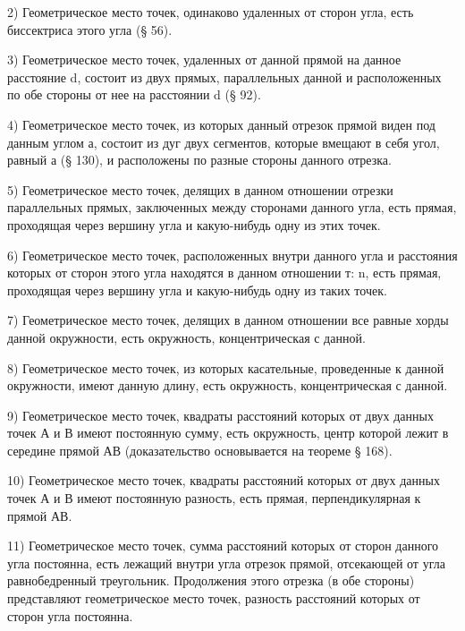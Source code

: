 2)                                  Геометрическое место точек, одинаково удаленных от сторон угла, есть биссектриса этого угла (§ 56).

3)                                     Геометрическое место точек, удаленных от данной прямой на данное расстояние d, состоит из двух прямых, параллельных данной и расположенных по обе стороны от нее на расстоянии d (§ 92).

4)                                  Геометрическое место точек, из которых данный отрезок прямой виден под данным углом а, состоит из дуг двух сегментов, которые вмещают в себя угол, равный а (§ 130), и расположены по разные стороны данного отрезка.

5)                                  Геометрическое место точек, делящих в данном отношении отрезки параллельных прямых, заключенных между сторонами данного угла, есть прямая, проходящая через вершину угла и какую-нибудь одну из этих точек.

6)                                 Геометрическое место точек, расположенных внутри данного угла и расстояния которых от сторон этого угла находятся в данном отношении т: n, есть прямая, проходящая через вершину угла и какую-нибудь одну из таких точек.

7)                                  Геометрическое место точек, делящих в данном отношении все равные хорды данной окружности, есть окружность, концентрическая с данной.

8)                                  Геометрическое место точек, из которых касательные, проведенные к данной окружности, имеют данную длину, есть окружность, концентрическая с данной.

9)                                  Геометрическое место точек, квадраты расстояний которых от двух данных точек А и В имеют постоянную сумму, есть окружность, центр которой лежит в середине прямой АВ (доказательство основывается на теореме § 168).

10)                                   Геометрическое место точек, квадраты расстояний которых от двух данных точек А и В имеют постоянную разность, есть прямая, перпендикулярная к прямой АВ.

11)                                  Геометрическое место точек, сумма расстояний которых от сторон данного угла постоянна, есть лежащий внутри угла отрезок прямой, отсекающей от угла равнобедренный треугольник. Продолжения этого отрезка (в обе стороны) представляют геометрическое место точек, разность расстояний которых от сторон угла постоянна.

